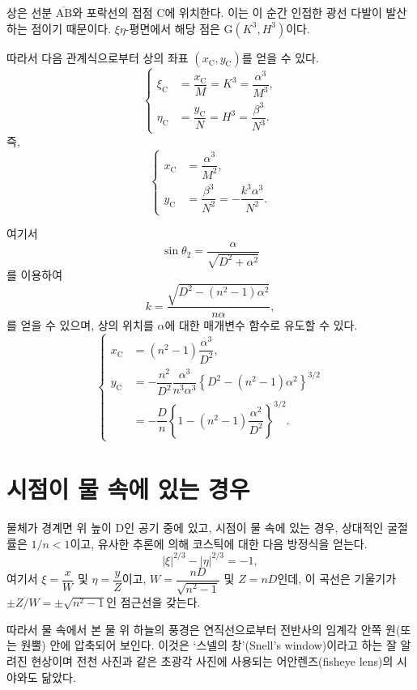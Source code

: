 \documentclass[twocolumn]{article}
\begin{document}
상은 선분 $\overline{\mathrm{AB}}$와 포락선의 접점 $\mathrm{C}$에 위치한다. 
이는 이 순간 인접한 광선 다발이 발산하는 점이기 때문이다. 
$\xi\eta$-평면에서 해당 점은 $\mathrm{G}(K^3, H^3)$이다.
	
따라서 다음 관계식으로부터 상의 좌표 $(x_{\mathrm{C}}^{}, y_{\mathrm{C}}^{})$를 얻을 수 있다.
$$ \left\{ 
\begin{aligned}
	\xi_{\mathrm{C}}^{} &= \dfrac{x_{\mathrm{C}}^{}}{M} = K^3 = \dfrac{\alpha^3}{M^3},\\
	\eta_{\mathrm{C}}^{} &= \dfrac{y_{\mathrm{C}}^{}}{N} = H^3 = \dfrac{\beta^3}{N^3}.
\end{aligned}
\right.$$
즉,
$$ \left\{ 
\begin{aligned}
	x_{\mathrm{C}}^{} &= \dfrac{\alpha^3}{M^2},\\
	y_{\mathrm{C}}^{} &= \dfrac{\beta^3}{N^2}=-\dfrac{k^3\alpha^3}{N^2}.
\end{aligned}
\right.$$

여기서
	$$\sin\theta_2 = \dfrac{\alpha}{\sqrt{D^2+\alpha^2}}$$
를 이용하여
$$k = \dfrac{\sqrt{D^2-(n^2-1)\alpha^2}}{n\alpha},$$
를 얻을 수 있으며, 
상의 위치를 $\alpha$에 대한 매개변수 함수로 유도할 수 있다.
$$ \left\{ 
\begin{aligned}
	x_{\mathrm{C}}^{} &= (n^2-1)\dfrac{\alpha^3}{D^2},\\
	y_{\mathrm{C}}^{} &= -\dfrac{n^2}{D^2}\dfrac{\alpha^3}
	{n^3\alpha^3}\left\{ D^2-(n^2-1)\alpha^2 \right\}^{3/2}\\
	&=-\dfrac{D}{n}\left\{ 1-(n^2-1)\dfrac{\alpha^2}{D^2} \right\}^{3/2}.
\end{aligned}
\right.$$
	
\section{시점이 물 속에 있는 경우}

물체가 경계면 위 높이 D인 공기 중에 있고, 
시점이 물 속에 있는 경우, 상대적인 굴절률은 $1/n < 1$이고, 
유사한 추론에 의해 코스틱에 대한 다음 방정식을 얻는다.
$$ \left| \xi \right|^{2/3} - \left| \eta \right|^{2/3} = -1, $$
여기서 $\xi = \dfrac{x}{W} $ 및 $\eta = \dfrac{y}{Z}$이고, 
$W = \dfrac{nD}{\sqrt{n^2-1}}$ 및 $Z = nD$인데,  이 곡선은 기울기가 
$\pm Z/W = \pm \sqrt{n^2-1}$인 점근선을 갖는다.

따라서 물 속에서 본 물 위 하늘의 풍경은
연직선으로부터 전반사의 임계각 안쪽 원(또는 원뿔) 안에 압축되어 보인다. 이것은 
`스넬의 창'(Snell's window)이라고 하는 잘 알려진 현상이며 전천 사진과 같은 초광각 
사진에 사용되는 어안렌즈(fisheye lens)의 시야와도 닮았다.
\end{document}
